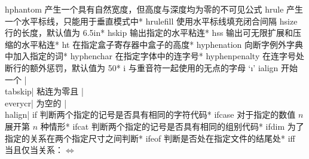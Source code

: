 \capcs hphantom {产生一个具有自然宽度，但高度与深度均为零的不可见公式}{}{}
\capcs hrule {产生一个水平标线，只能用于垂直模式中}*{}
\capcs hrulefill {使用水平标线填充闭合间隔}{}{}
\capcs hsize {行的长度，默认值为 6.5\thinspace in}*{}
\capcs hskip {输出指定的水平粘连}*{}
\capcs hss {输出可无限扩展和压缩的水平粘连}*{}
\capcs ht {在指定盒子寄存器中盒子的高度}*{}
\capcs hyphenation {向断字例外字典中加入指定的词}*{}
\capcs hyphenchar {在指定字体中的连字号}*{}
\capcs hyphenpenalty {在连字号处断行的额外惩罚，默认值为 50}*{}
\capcs i {与重音符一起使用的无点的字母 `\i'}{}{}
\capcs ialign {开始一个 |\\tabskip| 粘连为零且 |\\everycr| 为空的 |\\halign|}{}{}
\capcs if {判断两个指定的记号是否具有相同的字符代码}*{\@if}
\capcs ifcase {对于指定的数值 $n$ 展开第 $n$ 种情形}*{\@ifcase}
\capcs ifcat {判断两个指定的记号是否具有相同的组别代码}*{\@ifcat}
\capcs ifdim {为了指定的关系在两个指定尺寸之间判断}*{\@ifdim}
\capcs ifeof {判断是否处在指定文件的结尾处}*{\@ifeof}
\capcs iff {当且仅当关系：$\iff$}{}{}
